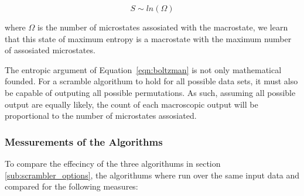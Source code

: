 		\begin{equation}
			S \sim ln(\Omega)
			\label{eqn:boltzman}
		\end{equation}

		where $\Omega$ is the number of microstates assosiated with the macrostate, we learn that this state of maximum entropy is a macrostate with the maximum number of assosiated microstates.
		\par
		The entropic argument of Equation~\ref{eqn:boltzman} is not only mathematical founded. 
		For a scramble algorithum to hold for all possible data sets, it must also be capable of outputing all possible permutations. 
		As such, assuming all possible output are equally likely, the count of each macroscopic output will be proportional to the number of microstates assosiated.

		\subsubsection{Messurements of the Algorithms} 
		\label{subsub:messurements_of_the_algorithms}

			To compare the effecincy of the three algorithums in section \ref{sub:scrambler_options}, the algorithums where run over the same input data and compared for the following measures:

